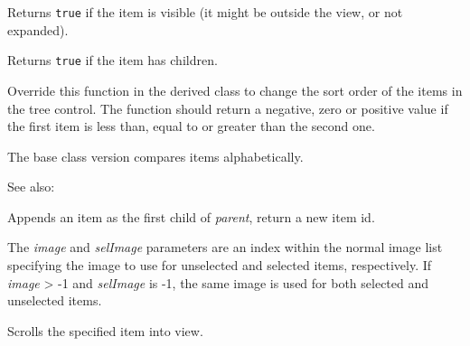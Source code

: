 \label{wxtreectrlisvisible}


Returns {\tt true} if the item is visible (it might be outside the view, or not expanded).


\label{wxtreectrlitemhaschildren}


Returns {\tt true} if the item has children.


\label{wxtreectrloncompareitems}


Override this function in the derived class to change the sort order of the
items in the tree control. The function should return a negative, zero or
positive value if the first item is less than, equal to or greater than the
second one.

The base class version compares items alphabetically.

See also: 


\label{wxtreectrlprependitem}


Appends an item as the first child of {\it parent}, return a new item id.

The {\it image} and {\it selImage} parameters are an index within
the normal image list specifying the image to use for unselected and
selected items, respectively.
If {\it image} > -1 and {\it selImage} is -1, the same image is used for
both selected and unselected items.


\label{wxtreectrlscrollto}


Scrolls the specified item into view.


\label{wxtreectrlselectitem}


